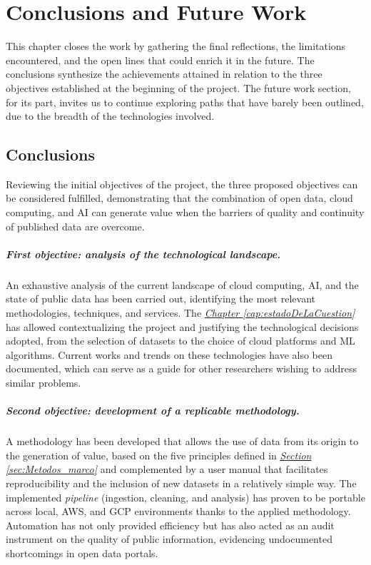 \chapter{Conclusions and Future Work}
\label{cap:Conclusions}

This chapter closes the work by gathering the final reflections, the limitations encountered, and the open lines that could enrich it in the future. The conclusions synthesize the achievements attained in relation to the three objectives established at the beginning of the project. The future work section, for its part, invites us to continue exploring paths that have barely been outlined, due to the breadth of the technologies involved.

\section{Conclusions}
\label{sec:Conclusions}

Reviewing the initial objectives of the project, the three proposed objectives can be considered fulfilled, demonstrating that the combination of open data, cloud computing, and AI can generate value when the barriers of quality and continuity of published data are overcome.

\paragraph{First objective: analysis of the technological landscape.}
An exhaustive analysis of the current landscape of cloud computing, AI, and the state of public data has been carried out, identifying the most relevant methodologies, techniques, and services. The \hyperref[cap:estadoDeLaCuestion]{\textit{Chapter \ref*{cap:estadoDeLaCuestion}}} has allowed contextualizing the project and justifying the technological decisions adopted, from the selection of datasets to the choice of cloud platforms and ML algorithms. Current works and trends on these technologies have also been documented, which can serve as a guide for other researchers wishing to address similar problems.

\paragraph{Second objective: development of a replicable methodology.}
A methodology has been developed that allows the use of data from its origin to the generation of value, based on the five principles defined in \hyperref[sec:Metodos_marco]{\textit{Section \ref*{sec:Metodos_marco}}} and complemented by a user manual that facilitates reproducibility and the inclusion of new datasets in a relatively simple way. The implemented \textit{pipeline} (ingestion, cleaning, and analysis) has proven to be portable across local, AWS, and GCP environments thanks to the applied methodology. Automation has not only provided efficiency but has also acted as an audit instrument on the quality of public information, evidencing undocumented shortcomings in open data portals.

